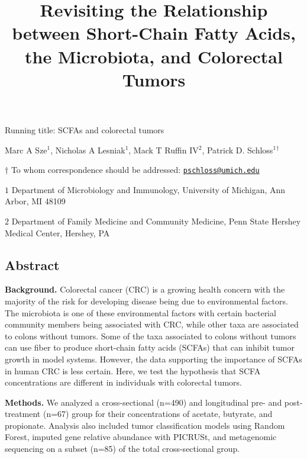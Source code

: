 \documentclass[11pt,]{article}
\title{Revisiting the Relationship between Short-Chain Fatty Acids, the
Microbiota, and Colorectal Tumors}
\author{}
\date{}
\begin{document}
\maketitle

\vspace{35mm}

Running title: SCFAs and colorectal tumors

\vspace{35mm}

Marc A Sze\({^1}\), Nicholas A Lesniak\({^1}\), Mack T Ruffin
IV\({^2}\), Patrick D. Schloss\({^1}\)\({^\dagger}\)

\vspace{40mm}

\(\dagger\) To whom correspondence should be addressed:
\href{mailto:pschloss@umich.edu}{\nolinkurl{pschloss@umich.edu}}

\(1\) Department of Microbiology and Immunology, University of Michigan,
Ann Arbor, MI 48109

\(2\) Department of Family Medicine and Community Medicine, Penn State
Hershey Medical Center, Hershey, PA

\newpage

\linenumbers

\subsection{Abstract}\label{abstract}

\textbf{Background.} Colorectal cancer (CRC) is a growing health concern
with the majority of the risk for developing disease being due to
environmental factors. The microbiota is one of these environmental
factors with certain bacterial community members being associated with
CRC, while other taxa are associated to colons without tumors. Some of
the taxa associated to colons without tumors can use fiber to produce
short-chain fatty acids (SCFAs) that can inhibit tumor growth in model
systems. However, the data supporting the importance of SCFAs in human
CRC is less certain. Here, we test the hypothesis that SCFA
concentrations are different in individuals with colorectal tumors.

\textbf{Methods.} We analyzed a cross-sectional (n=490) and longitudinal
pre- and post-treatment (n=67) group for their concentrations of
acetate, butyrate, and propionate. Analysis also included tumor
classification models using Random Forest, imputed gene relative
abundance with PICRUSt, and metagenomic sequencing on a subset (n=85) of
the total cross-sectional group.
\end{document}
